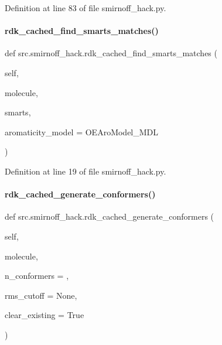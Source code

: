 Definition at line 83 of file smirnoff\+\_\+hack.\+py.

\mbox{\label{namespacesrc_1_1smirnoff__hack_a669420dbb65d1007fb20e65c9712c564}} 
\paragraph{\texorpdfstring{rdk\+\_\+cached\+\_\+find\+\_\+smarts\+\_\+matches()}{rdk\_cached\_find\_smarts\_matches()}}
{\footnotesize\ttfamily def src.\+smirnoff\+\_\+hack.\+rdk\+\_\+cached\+\_\+find\+\_\+smarts\+\_\+matches (\begin{DoxyParamCaption}\item[{}]{self,  }\item[{}]{molecule,  }\item[{}]{smarts,  }\item[{}]{aromaticity\+\_\+model = {\ttfamily \textquotesingle{}OEAroModel\+\_\+MDL\textquotesingle{}} }\end{DoxyParamCaption})}



Definition at line 19 of file smirnoff\+\_\+hack.\+py.

\mbox{\label{namespacesrc_1_1smirnoff__hack_ab16c07d1d10df893e4bd3c47f09e46dd}} 
\paragraph{\texorpdfstring{rdk\+\_\+cached\+\_\+generate\+\_\+conformers()}{rdk\_cached\_generate\_conformers()}}
{\footnotesize\ttfamily def src.\+smirnoff\+\_\+hack.\+rdk\+\_\+cached\+\_\+generate\+\_\+conformers (\begin{DoxyParamCaption}\item[{}]{self,  }\item[{}]{molecule,  }\item[{}]{n\+\_\+conformers = {},  }\item[{}]{rms\+\_\+cutoff = {\ttfamily None},  }\item[{}]{clear\+\_\+existing = {\ttfamily True} }\end{DoxyParamCaption})}



